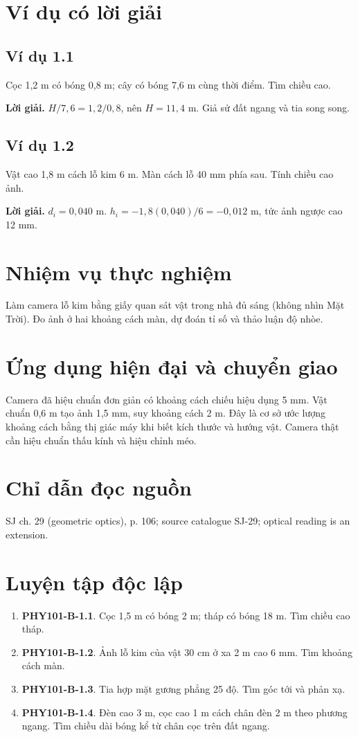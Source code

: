 \documentclass[11pt,a4paper,openany]{book}
\begin{document}
\section{Ví dụ có lời giải}
\subsection*{Ví dụ 1.1}
Cọc 1,2 m có bóng 0,8 m; cây có bóng 7,6 m cùng thời điểm. Tìm chiều cao.

\textbf{Lời giải.} $H/7{,}6=1{,}2/0{,}8$, nên $H=11{,}4$ m. Giả sử đất ngang và tia song song.
\subsection*{Ví dụ 1.2}
Vật cao 1,8 m cách lỗ kim 6 m. Màn cách lỗ 40 mm phía sau. Tính chiều cao ảnh.

\textbf{Lời giải.} $d_i=0{,}040$ m. $h_i=-1{,}8(0{,}040)/6=-0{,}012$ m, tức ảnh ngược cao 12 mm.
\section{Nhiệm vụ thực nghiệm}
Làm camera lỗ kim bằng giấy quan sát vật trong nhà đủ sáng (không nhìn Mặt Trời). Đo ảnh ở hai khoảng cách màn, dự đoán tỉ số và thảo luận độ nhòe.
\section{Ứng dụng hiện đại và chuyển giao}
Camera đã hiệu chuẩn đơn giản có khoảng cách chiếu hiệu dụng 5 mm. Vật chuẩn 0,6 m tạo ảnh 1,5 mm, suy khoảng cách 2 m. Đây là cơ sở ước lượng khoảng cách bằng thị giác máy khi biết kích thước và hướng vật. Camera thật cần hiệu chuẩn thấu kính và hiệu chỉnh méo.
\section{Chỉ dẫn đọc nguồn}
SJ ch. 29 (geometric optics), p. 106; source catalogue SJ-29; optical reading is an extension.
\section{Luyện tập độc lập}
\begin{enumerate}
\item \textbf{PHY101-B-1.1}. Cọc 1,5 m có bóng 2 m; tháp có bóng 18 m. Tìm chiều cao tháp.
\item \textbf{PHY101-B-1.2}. Ảnh lỗ kim của vật 30 cm ở xa 2 m cao 6 mm. Tìm khoảng cách màn.
\item \textbf{PHY101-B-1.3}. Tia hợp mặt gương phẳng 25 độ. Tìm góc tới và phản xạ.
\item \textbf{PHY101-B-1.4}. Đèn cao 3 m, cọc cao 1 m cách chân đèn 2 m theo phương ngang. Tìm chiều dài bóng kể từ chân cọc trên đất ngang.
\end{enumerate}
\end{document}
